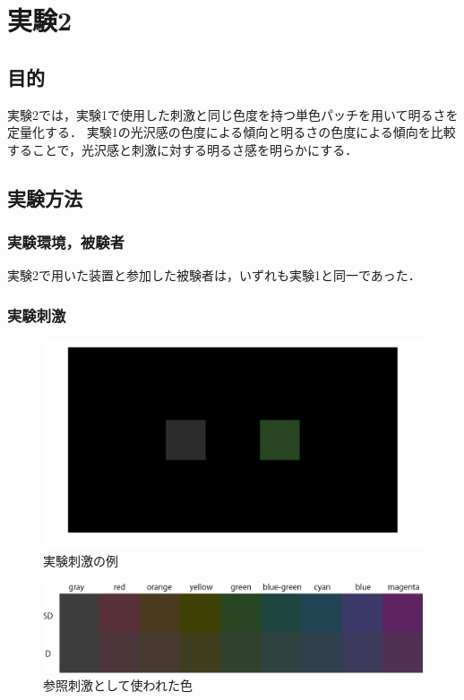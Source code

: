 \chapter{実験2}

\section{目的}

    実験2では，実験1で使用した刺激と同じ色度を持つ単色パッチを用いて明るさを定量化する．
    実験1の光沢感の色度による傾向と明るさの色度による傾向を比較することで，光沢感と刺激に対する明るさ感を明らかにする．


\section{実験方法}
    \subsection{実験環境，被験者}

        実験2で用いた装置と参加した被験者は，いずれも実験1と同一であった．

    \subsection{実験刺激}

        \begin{figure}[h]
            \centering
            \includegraphics[width=14.0cm]{./img/ex2_stimuli2.png}
            \caption{実験刺激の例}
            \label{ex2_stimuli}
        \end{figure}

        \begin{figure}[h]
            \centering
            \includegraphics[width=14.0cm]{./img/ex2_stimuli_p.png}
            \caption{参照刺激として使われた色}
            \label{ex2_stimuli_set}
        \end{figure}
        \newpage

